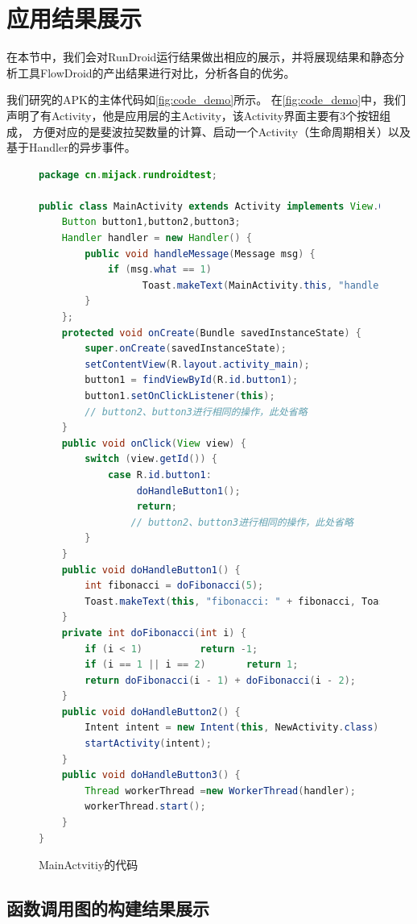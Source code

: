 \section{应用结果展示}  
在本节中，我们会对RunDroid运行结果做出相应的展示，并将展现结果和静态分析工具FlowDroid的产出结果进行对比，分析各自的优劣。

我们研究的APK的主体代码如\autoref{fig:code_demo}所示。
在\autoref{fig:code_demo}中，我们声明了有Activity，他是应用层的主Activity，该Activity界面主要有3个按钮组成，
方便对应的是斐波拉契数量的计算、启动一个Activity（生命周期相关）以及基于Handler的异步事件。



\begin{figure}[!h]
	\centering
	\begin{lstlisting}[language=Java]
package cn.mijack.rundroidtest;

public class MainActivity extends Activity implements View.OnClickListener {
	Button button1,button2,button3;
	Handler handler = new Handler() {
		public void handleMessage(Message msg) {
			if (msg.what == 1)   
			      Toast.makeText(MainActivity.this, "handle", Toast.LENGTH_SHORT).show();
		}
	};
	protected void onCreate(Bundle savedInstanceState) {
		super.onCreate(savedInstanceState);
		setContentView(R.layout.activity_main);
		button1 = findViewById(R.id.button1);
		button1.setOnClickListener(this);   	
		// button2、button3进行相同的操作，此处省略
	}
	public void onClick(View view) {
		switch (view.getId()) {
			case R.id.button1:		
			     doHandleButton1();		
			     return;				 	
				// button2、button3进行相同的操作，此处省略
		}
	}
	public void doHandleButton1() {
		int fibonacci = doFibonacci(5);
		Toast.makeText(this, "fibonacci: " + fibonacci, Toast.LENGTH_SHORT).show();
	}
	private int doFibonacci(int i) {
		if (i < 1)			return -1;
		if (i == 1 || i == 2) 		return 1;
		return doFibonacci(i - 1) + doFibonacci(i - 2);
	}
	public void doHandleButton2() {
		Intent intent = new Intent(this, NewActivity.class);
		startActivity(intent);
	}
	public void doHandleButton3() {
		Thread workerThread =new WorkerThread(handler);
		workerThread.start();
	}
}\end{lstlisting}
	\caption{MainActvitiy的代码}
	\label{fig:code_demo}
\end{figure}



\subsection{函数调用图的构建结果展示}

